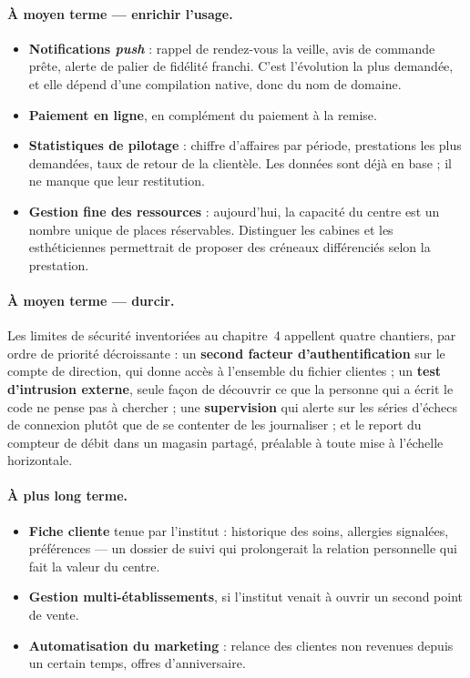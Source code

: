 \paragraph{À moyen terme --- enrichir l'usage.}
\begin{itemize}[leftmargin=1.2cm,nosep]
  \item \textbf{Notifications \textit{push}} : rappel de rendez-vous la veille,
  avis de commande prête, alerte de palier de fidélité franchi. C'est
  l'évolution la plus demandée, et elle dépend d'une compilation native, donc
  du nom de domaine.
  \item \textbf{Paiement en ligne}, en complément du paiement à la remise.
  \item \textbf{Statistiques de pilotage} : chiffre d'affaires par période,
  prestations les plus demandées, taux de retour de la clientèle. Les données
  sont déjà en base ; il ne manque que leur restitution.
  \item \textbf{Gestion fine des ressources} : aujourd'hui, la capacité du
  centre est un nombre unique de places réservables. Distinguer les cabines et
  les esthéticiennes permettrait de proposer des créneaux différenciés selon la
  prestation.
\end{itemize}

\paragraph{À moyen terme --- durcir.} Les limites de sécurité inventoriées au
chapitre~4 appellent quatre chantiers, par ordre de priorité décroissante : un
\textbf{second facteur d'authentification} sur le compte de direction, qui donne
accès à l'ensemble du fichier clientes ; un \textbf{test d'intrusion externe},
seule façon de découvrir ce que la personne qui a écrit le code ne pense pas à
chercher ; une \textbf{supervision} qui alerte sur les séries d'échecs de
connexion plutôt que de se contenter de les journaliser ; et le report du
compteur de débit dans un magasin partagé, préalable à toute mise à l'échelle
horizontale.

\paragraph{À plus long terme.}
\begin{itemize}[leftmargin=1.2cm,nosep]
  \item \textbf{Fiche cliente} tenue par l'institut : historique des soins,
  allergies signalées, préférences --- un dossier de suivi qui prolongerait la
  relation personnelle qui fait la valeur du centre.
  \item \textbf{Gestion multi-établissements}, si l'institut venait à ouvrir un
  second point de vente.
  \item \textbf{Automatisation du marketing} : relance des clientes non revenues
  depuis un certain temps, offres d'anniversaire.
\end{itemize}

